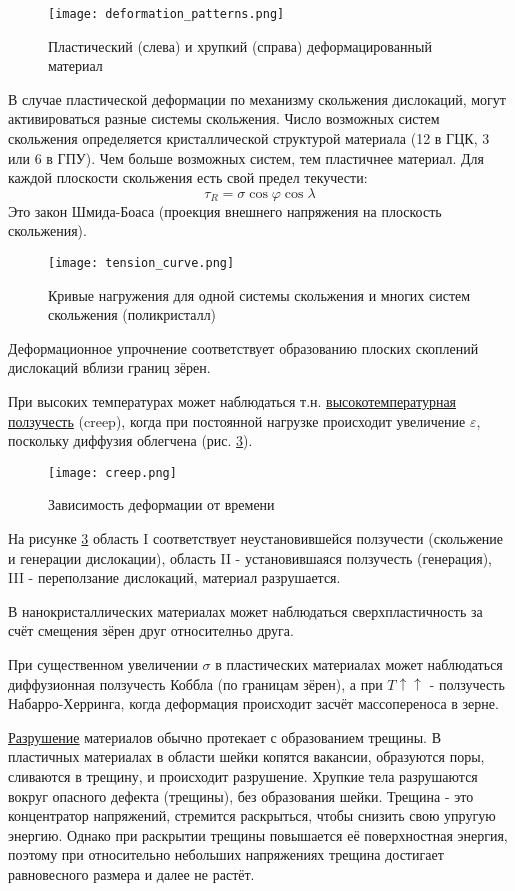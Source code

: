 \begin{figure}[h!]
\centering
\texttt{[image: deformation\_patterns.png]}\caption{Пластический (слева) и хрупкий (справа) деформацированный материал} \label{fig:deformation_patterns}
\end{figure} 
В случае пластической деформации по механизму скольжения дислокаций, могут активироваться разные системы скольжения. Число возможных систем скольжения определяется кристаллической структурой материала (12 в ГЦК, 3 или 6 в ГПУ). Чем больше возможных систем, тем пластичнее материал. Для каждой плоскости скольжения есть свой  предел текучести:
\begin{equation}
\tau_R = \sigma \cos \varphi \cos \lambda
\label{eq:Schmidt-Boas}  
\end{equation}
Это закон Шмида-Боаса (проекция внешнего напряжения на плоскость скольжения).
\begin{figure}[h!]
\centering
\texttt{[image: tension\_curve.png]}\caption{Кривые нагружения для одной системы скольжения и многих систем скольжения (поликристалл)} \label{fig:tension_curve}
\end{figure} 
Деформационное упрочнение соответствует образованию плоских скоплений дислокаций вблизи границ зёрен.\par
При высоких температурах может наблюдаться  т.н. \underline{высокотемпературная ползучесть} (creep), когда при постоянной нагрузке происходит увеличение $\varepsilon$, поскольку диффузия облегчена (рис. \ref{fig:creep}).
\begin{figure}[h!]
\centering
\texttt{[image: creep.png]}\caption{Зависимость деформации от времени} \label{fig:creep}
\end{figure} 
На рисунке \ref{fig:creep} область I соответствует неустановившейся ползучести (скольжение и генерации дислокации), область II - установившаяся ползучесть (генерация), III - переползание дислокаций, материал разрушается.
\par
В нанокристаллических материалах может наблюдаться сверхпластичность за счёт смещения зёрен друг относителньо друга. 
\par При существенном увеличении $\sigma$ в пластических материалах может наблюдаться диффузионная ползучесть Коббла (по границам зёрен), а при $T\uparrow \uparrow$ - ползучесть Набарро-Херринга, когда деформация происходит засчёт массопереноса в зерне. 
\par
\underline{Разрушение} материалов обычно протекает с образованием трещины. В пластичных материалах в области шейки копятся вакансии, образуются поры, сливаются в трещину, и происходит разрушение. Хрупкие тела разрушаются вокруг опасного дефекта (трещины), без образования шейки. Трещина - это концентратор напряжений, стремится раскрыться, чтобы снизить свою упругую энергию. Однако при раскрытии трещины повышается её поверхностная энергия, поэтому при относительно небольших напряжениях трещина достигает равновесного размера и далее не растёт.
